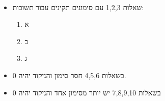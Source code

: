 \documentclass[12pt, a4paper]{article}
\begin{document}
\begin{center}
\ 

\begin{itemize}[label=$\bullet$]
    \item שאלות 1,2,3 עם סימונים תקינים עבור תשובות:
    \begin{enumerate}
        \item א
        \item ב
        \item ג
    \end{enumerate}
    \item בשאלות 4,5,6 חסר סימון והניקוד יהיה 0.
    \item בשאלות 7,8,9,10
    יש יותר מסימון אחד והניקוד יהיה 0
\end{itemize}


\end{center}



\newpage

\underline{{\Large
}}
\end{document}
